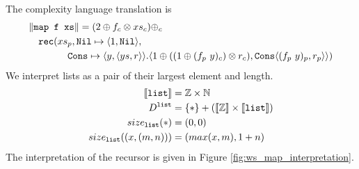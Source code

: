 %
The complexity language translation is
%
\begin{equation*}
\begin{split}
    &\|\texttt{map f xs}\| = (2 \oplus f_c \otimes xs_c) \oplus_c \\
    &\quad \texttt{rec}(xs_p, \texttt{Nil}\mapsto \langle 1, \texttt{Nil}\rangle, \\
    &\qquad\quad\quad \texttt{Cons} \mapsto \langle y, \langle ys, r \rangle \rangle. \langle 1 \oplus ((1 \oplus (f_p\ y)_c) \otimes r_c), \texttt{Cons} \langle (f_p\ y)_p, r_p \rangle \rangle)
\end{split}
\end{equation*}
%
We interpret lists as a pair of their largest element and length.
%
\begin{align*}
  \llbracket \texttt{list} \rrbracket &= \mathbb{Z} \times \mathbb{N} \\
  D^{\texttt{list}} &= \{*\} + (\llbracket \mathbb{Z} \rrbracket \times \llbracket \texttt{list} \rrbracket) \\
  size_{\texttt{list}}(*) &= (0, 0) \\
  size_{\texttt{list}}((x, (m, n))) &= (max(x, m), 1 + n)
\end{align*}
%
The interpretation of the recursor is given in Figure \ref{fig:ws_map_interpretation}.
%
